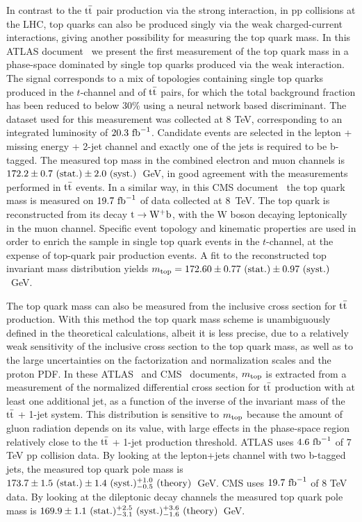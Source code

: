 \documentclass{blois}
\begin{document}
In contrast to the ${\rm t{\bar t}}$ pair production via the strong
interaction, in pp collisions at the LHC, top quarks can also be produced singly
via the weak charged-current interactions, giving another possibility for
measuring the top quark mass. In this ATLAS document~\cite{bib:ATLAS-singleTop8TeV}
we present the first measurement of the top quark mass in a phase-space
dominated by single top quarks produced via the weak interaction. The signal
corresponds to a mix of topologies containing single top quarks produced in the
$t$-channel and of ${\rm t{\bar t}}$ pairs, for which the total background
fraction has been reduced to below 30\% using a neural network based discriminant.
The dataset used for this measurement was collected at 8 TeV, corresponding to an
integrated luminosity of
$20.3~{\rm fb}^{-1}$. Candidate events are selected in the lepton + missing
energy + 2-jet channel and exactly one of the jets is required to be b-tagged.
The measured top mass in the combined electron and muon channels is
$172.2 \pm 0.7~({\rm stat.}) \pm 2.0~({\rm syst.})$~GeV, in good agreement
with the measurements performed in ${\rm t{\bar t}}$ events. In a similar way,
in this CMS document~\cite{bib:CMS-singleTop8TeV} the top quark mass is
measured on $19.7~{\rm fb}^{-1}$ of data collected at 8~TeV. The top quark is
reconstructed from its decay ${\rm t\to W^+b}$, with the W boson decaying
leptonically in the muon channel. Specific event topology and kinematic 
properties are used in order to enrich the sample in single top quark events
in the $t$-channel, at the expense of top-quark pair production events. A fit
to the reconstructed top invariant mass distribution yields
$m_{\rm top} = 172.60 \pm 0.77~({\rm stat.}) \pm 0.97~({\rm syst.})$~GeV.

The top quark mass can also be measured from the inclusive cross section for
${\rm t{\bar t}}$ production. With this method the top quark mass scheme is
unambiguously defined in the theoretical calculations, albeit it is less precise,
due to a relatively weak sensitivity of the inclusive cross section to the
top quark mass, as well as to the large uncertainties on the factorization and
normalization scales and the proton PDF. In these
ATLAS~\cite{bib:ATLAS-topPoleMass} and CMS~\cite{bib:CMS-topPoleMass} documents,
$m_{\rm top}$ is extracted from a measurement of the normalized differential
cross section for ${\rm t{\bar t}}$ production with at least one additional
jet, as a function of the inverse of the invariant mass of the
${\rm t{\bar t}}$ + 1-jet system. This distribution is sensitive to
$m_{\rm top}$ because the amount of gluon radiation depends on its value,
with large effects in the phase-space region relatively close to the
${\rm t{\bar t}}$ + 1-jet production threshold. ATLAS uses $4.6~{\rm fb}^{-1}$ of
7 TeV pp collision data. By looking at the lepton+jets channel with two
b-tagged jets, the measured top quark pole mass is
$173.7 \pm 1.5~({\rm stat.}) \pm 1.4~({\rm syst.})^{+1.0}_{-0.5}~({\rm theory})$~GeV.
CMS uses $19.7~{\rm fb}^{-1}$ of 8 TeV data. By looking at the dileptonic decay
channels the measured top quark pole mass is
$169.9 \pm 1.1~({\rm stat.})^{+2.5}_{-3.1}~({\rm syst.})^{+3.6}_{-1.6}~({\rm theory})$~GeV.
\end{document}
